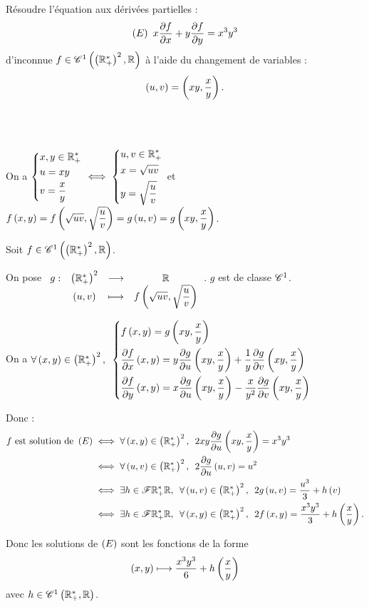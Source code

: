 \begin{corr}
\end{corr}

\begin{exo}[Exercice 12]
Résoudre l'équation aux dérivées partielles : \[\left(E\right)~x\pdv{f}{x}+y\pdv{f}{y}=x^3y^3\] d'inconnue \(f\in\mathscr{C}^{1}\left(\left(\mathbb{R}_+^*\right)^2,\mathbb{R}\right)\) à l'aide du changement de variables : \[\left(u,v\right)=\left(xy,\dfrac{x}{y}\right).\]
\end{exo}

\begin{corr}~\\
\begin{brouill}~\\
On a \(\begin{dcases}
x,y\in\mathbb{R}_+^* \\
u=xy \\
v=\dfrac{x}{y}
\end{dcases}\iff\begin{dcases}
u,v\in\mathbb{R}_+^* \\
x=\sqrt{uv} \\
y=\sqrt{\dfrac{u}{v}}
\end{dcases}\) et \(f\left(x,y\right)=f\left(\sqrt{uv},\sqrt{\dfrac{u}{v}}\right)=g\left(u,v\right)=g\left(xy,\dfrac{x}{y}\right)\).
\end{brouill}

Soit \(f\in\mathscr{C}^{1}\left(\left(\mathbb{R}_+^*\right)^2,\mathbb{R}\right)\).

On pose \(\begin{array}[t]{cccc}g : & \left(\mathbb{R}_+^*\right)^2 & \longrightarrow & \mathbb{R} \\ & \left(u,v\right) & \longmapsto & f\left(\sqrt{uv},\sqrt{\dfrac{u}{v}}\right)\end{array}\). \(g\) est de classe \(\mathscr{C}^{1}\).

On a \(\quantifs{\forall\paren{x,y}\in\paren{\Rps}^2}\begin{dcases}
f\paren{x,y}=g\paren{xy,\dfrac{x}{y}} \\
\pdv{f}{x}\paren{x,y}=y\pdv{g}{u}\paren{xy,\dfrac{x}{y}}+\dfrac{1}{y}\pdv{g}{v}\paren{xy,\dfrac{x}{y}} \\
\pdv{f}{y}\paren{x,y}=x\pdv{g}{u}\paren{xy,\dfrac{x}{y}}-\dfrac{x}{y^2}\pdv{g}{v}\paren{xy,\dfrac{x}{y}}
\end{dcases}\)

Donc : \[\begin{aligned}
f\text{ est solution de }\paren{E}&\ssi\quantifs{\forall\paren{x,y}\in\paren{\Rps}^2}2xy\pdv{g}{u}\paren{xy,\dfrac{x}{y}}=x^3y^3 \\
&\ssi\quantifs{\forall\paren{u,v}\in\paren{\Rps}^2}2\pdv{g}{u}\paren{u,v}=u^2 \\
&\ssi\quantifs{\exists h\in\F{\Rps}{\R};\forall\paren{u,v}\in\paren{\Rps}^2}2g\paren{u,v}=\dfrac{u^3}{3}+h\paren{v} \\
&\ssi\quantifs{\exists h\in\F{\Rps}{\R};\forall\paren{x,y}\in\paren{\Rps}^2}2f\paren{x,y}=\dfrac{x^3y^3}{3}+h\paren{\dfrac{x}{y}}.
\end{aligned}\]

Donc les solutions de \(\left(E\right)\) sont les fonctions de la forme \[\left(x,y\right)\longmapsto\dfrac{x^3y^3}{6}+h\left(\dfrac{x}{y}\right)\] avec \(h\in\mathscr{C}^{1}\left(\mathbb{R}_+^*,\mathbb{R}\right)\).
\end{corr}

